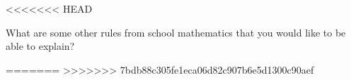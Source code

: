 \documentclass{ximera}
\begin{document}
<<<<<<< HEAD
\begin{problem}[0.5in]
What are some other rules from school mathematics that you would like to be able to explain?  
\begin{freeResponse}
\end{freeResponse}
\end{problem}
=======
>>>>>>> 7bdb88c305fe1eca06d82c907b6e5d1300c90aef
\end{document}
